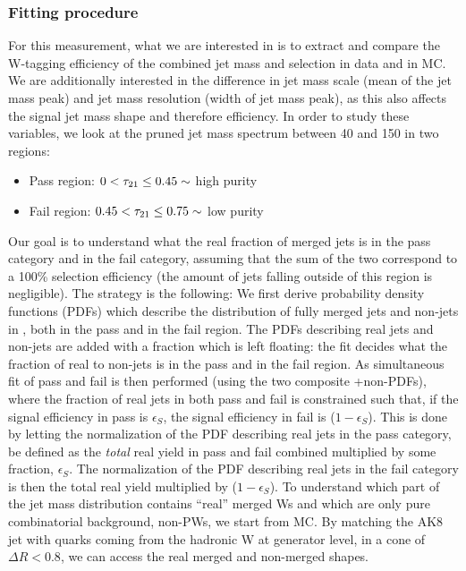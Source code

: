 \subsubsection{Fitting procedure}
For this measurement, what we are interested in is to extract and compare the W-tagging efficiency of the combined jet mass and \nsubj selection in data and in MC. We are additionally interested in the difference in jet mass scale (mean of the \PW jet mass peak) and jet mass resolution (width of \PW jet mass peak), as this also affects the signal jet mass shape and therefore efficiency. In order to study these variables, we look at the pruned jet mass spectrum between 40 and 150 \GeV in two regions: 
\begin{itemize}
\itemsep0em 
  \item Pass region: $0 <  \tau_{21} \leq 0.45 \sim$ high purity
  \item Fail region: $0.45 < \tau_{21} \leq 0.75\sim$ low purity
\end{itemize}
Our goal is to understand what the real fraction of merged \PW jets is in the pass category and in the fail category, assuming that the sum of the two correspond to a 100\% selection efficiency (the amount of \PW jets falling outside of this region is negligible).
The strategy is the following: We first derive probability density functions (PDFs) which describe the distribution of fully merged \PW jets and non-\PW jets in \ttbar, both in the pass and in the fail region. The PDFs describing real \PW jets and non-\PW jets are added with a fraction which is left floating: the fit decides what the fraction of real \PW to non-\PW jets is in the pass and in the fail region. As simultaneous fit of pass and fail is then performed (using the two composite \PW+non-\PW PDFs), where the fraction of real \PW jets in both pass and fail is constrained such that, if the signal efficiency in pass is $\epsilon_S$, the signal efficiency in fail is ($1-\epsilon_S$). This is done by letting the normalization of the PDF describing real \PW jets in the pass category, be defined as the \textit{total} real \PW yield in pass and fail combined multiplied by some fraction, $\epsilon_S$. The normalization of the PDF describing real \PW jets in the fail category is then the total real \PW yield multiplied by ($1-\epsilon_S$).\newline
To understand which part of the \ttbar jet mass distribution contains ``real'' merged Ws and which are only pure combinatorial background, non-PWs, we start from \ttbar MC.
By matching the AK8 jet with quarks coming from the hadronic W at generator level, in a cone of $\Delta R < 0.8$, we can access the real merged \PW and non-merged \PW shapes.
